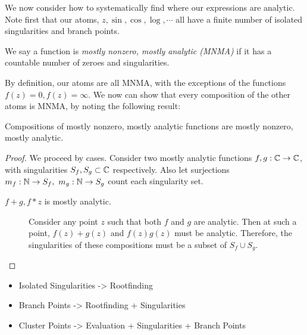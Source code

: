 
We now consider how to systematically find where our expressions are analytic.
Note first that our atoms, $z, \sin, \cos, \log, \cdots$ all have a finite
number of isolated singularities and branch points.

\begin{definition}
  We say a function is \emph{mostly nonzero, mostly analytic (MNMA)} if it has
  a countable number of zeroes and singularities.
\end{definition}

By definition, our atoms are all MNMA, with the exceptions of the functions
$f(z) = 0, f(z) = \infty$. We now can show that every composition of the other
atoms is MNMA, by noting the following result:

\begin{lemma}
  Compositions of mostly nonzero, mostly analytic functions are mostly
  nonzero, mostly analytic.
\end{lemma}
\begin{proof}
  We proceed by cases. Consider two mostly analytic functions
  $f, g: \mathbb{C} \to \mathbb{C}$, with singularities $S_f, S_g \subset \mathbb{C}$ respectively.
  Also let surjections $m_f: \mathbb{N} \to S_f,\ m_g: \mathbb{N} \to S_g$ count each
  singularity set.
  \begin{description}
    \item[$f + g, f * z$ is mostly analytic.] Consider any point $z$ such that
    both $f$ and $g$ are analytic. Then at such a point, $f(z) + g(z)$ and
    $f(z)g(z)$ must be analytic. Therefore, the singularities of these
    compositions must be a subset of $S_f \cup S_g$.
  \end{description}
\end{proof}

\begin{itemize}
  \item Isolated Singularities -> Rootfinding
  \item Branch Points -> Rootfinding + Singularities
  \item Cluster Points -> Evaluation + Singularities + Branch Points
\end{itemize}
